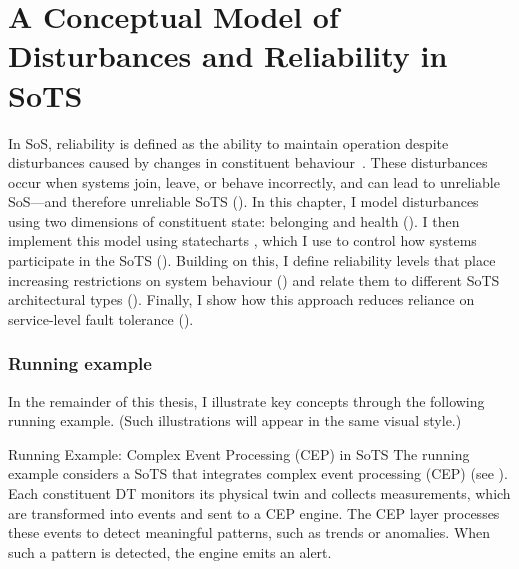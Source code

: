 \chapter{A Conceptual Model of Disturbances and Reliability in SoTS}\label{ch:reliable-sots}
In SoS, reliability is defined as the ability to maintain operation despite disturbances caused by changes in constituent behaviour~\cite{ferreira2023towards}. These disturbances occur when systems join, leave, or behave incorrectly, and can lead to unreliable SoS---and therefore unreliable SoTS (). In this chapter, I model disturbances using two dimensions of constituent state: belonging and health (). I then implement this model using statecharts \cite{harel1987statecharts}, which I use to control how systems participate in the SoTS (). Building on this, I define reliability levels that place increasing restrictions on system behaviour () and relate them to different SoTS architectural types (). Finally, I show how this approach reduces reliance on service-level fault tolerance ().

\subsection*{Running example}

In the remainder of this thesis, I illustrate key concepts through the following running example. (Such illustrations will appear in the same visual style.)

\begin{runningexample}{Running Example: Complex Event Processing (CEP) in SoTS}
The running example considers a SoTS that integrates complex event processing (CEP) (see ). Each constituent DT monitors its physical twin and collects measurements, which are transformed into events and sent to a CEP engine. The CEP layer processes these events to detect meaningful patterns, such as trends or anomalies. When such a pattern is detected, the engine emits an alert.
\end{runningexample}

